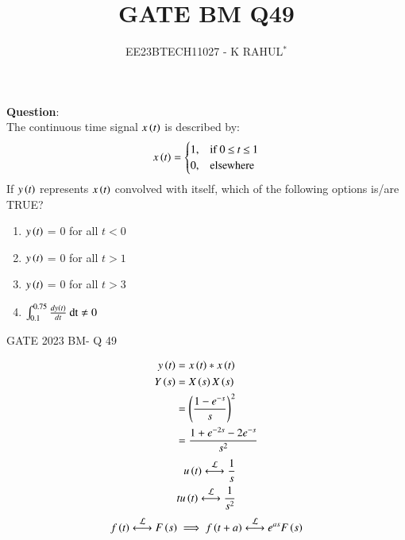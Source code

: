 \documentclass[journal,12pt,twocolumn]{IEEEtran}
\theoremstyle{remark}
\begin{document}

\vspace{3cm}
\title{GATE BM Q49}
\author{EE23BTECH11027 - K RAHUL$^{*}$%
}
\maketitle
\newpage
\bigskip
\renewcommand{\thefigure}{\theenumi}
\renewcommand{\thetable}{\theenumi}
\textbf{Question}:\\
The continuous time signal $x\left(t\right)$ is described by:
\begin{align}
x\left(t\right)=
    \begin{cases}
        1, & \text{if } 0\: {\displaystyle \leq }\:t\:{\displaystyle \leq }\:1\\
        0, & \text{elsewhere}
    \end{cases} 
\end{align}
If $y\left(t\right)$ represents $x\left(t\right)$ convolved with itself, which of the following options is/are TRUE?
\begin{enumerate}[label = (\Alph*)]
    \item $y\left(t\right)$ = 0 for all $t<0$ \label{gate.bm.49.a}\\
    \item $y\left(t\right)$ = 0 for all $t>1$ \label{gate.bm.49.b}\\
    \item $y\left(t\right)$ = 0 for all $t>3$ \label{gate.bm.49.c}\\
    \item $\int_{0.1}^{0.75} \frac{dy\left(t\right)}{dt}\: \text{dt} \neq 0$ \label{gate.bm.49.d}
\end{enumerate} \hfill{GATE 2023 BM- Q 49}\\
\bigskip 
\bigskip
\solution
\begin{table}[ht]

\end{table}
\bigskip
\begin{align}
    y\left(t\right) &= x\left(t\right) * x\left(t\right)\\
    Y\left(s\right) &= X\left(s\right)X\left(s\right)\\
    &=\left(\frac{1-e^{-s}}{s}\right)^2\\
    &=\frac{1+e^{-2s}-2e^{-s}}{s^2}
\end{align}
\begin{align}
u\brak{t} \system{L} \frac{1}{s}\\
tu\brak{t} \system{L} \frac{1}{s^2} \label{11027_lap_1}
\end{align}
\begin{align}
    f\brak{t} \system{L} F\brak{s}  \implies f\brak{t+a} \system{L} e^{as}F\brak{s} \label{11027_lap_2}
\end{align}\\
\end{document}
